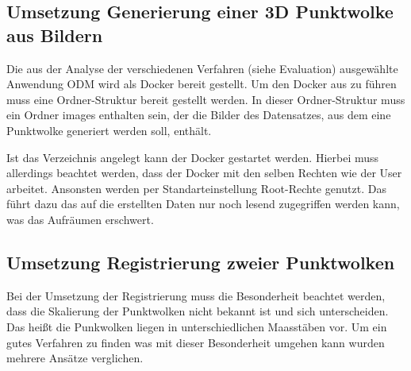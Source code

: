 \documentclass[12pt,titlepage, twoside]{article}
\begin{document}
\subsection{Umsetzung Generierung einer 3D Punktwolke aus Bildern}
\label{sec:realisierung:implementierung1}

Die aus der Analyse der verschiedenen Verfahren (siehe Evaluation) ausgewählte Anwendung ODM wird als Docker bereit gestellt. Um den Docker aus zu führen muss eine Ordner-Struktur bereit gestellt werden.
In dieser Ordner-Struktur muss ein Ordner \glqq images\grqq{} enthalten sein, der die Bilder des Datensatzes, aus dem eine Punktwolke generiert werden soll, enthält.

Ist das Verzeichnis angelegt kann der Docker gestartet werden. Hierbei muss allerdings beachtet werden, dass der Docker mit den selben Rechten wie der User arbeitet. Ansonsten werden per Standarteinstellung Root-Rechte genutzt.
Das führt dazu das auf die erstellten Daten nur noch lesend zugegriffen werden kann, was das Aufräumen erschwert.

\subsection{Umsetzung Registrierung zweier Punktwolken}
\label{sec:realisierung:implementierung2}

Bei der Umsetzung der Registrierung muss die Besonderheit beachtet werden, dass die Skalierung der Punktwolken nicht bekannt ist und sich unterscheiden. Das heißt die Punkwolken liegen in unterschiedlichen Maasstäben vor.  
Um ein gutes Verfahren zu finden was mit dieser Besonderheit umgehen kann wurden mehrere Ansätze verglichen.
\end{document}
